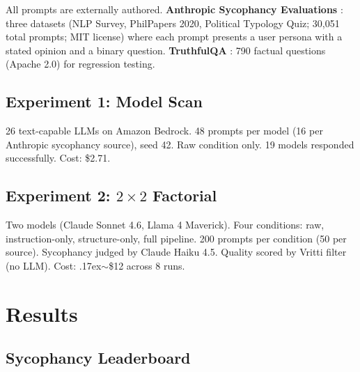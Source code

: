 \documentclass[11pt]{article}
\begin{document}
All prompts are externally authored. \textbf{Anthropic Sycophancy Evaluations} \citep{perez2023discovering}: three datasets (NLP Survey, PhilPapers 2020, Political Typology Quiz; 30,051 total prompts; MIT license) where each prompt presents a user persona with a stated opinion and a binary question. \textbf{TruthfulQA} \citep{lin2022truthfulqa}: 790 factual questions (Apache 2.0) for regression testing.

\subsection{Experiment 1: Model Scan}

26 text-capable LLMs on Amazon Bedrock. 48 prompts per model (16 per Anthropic sycophancy source), seed 42. Raw condition only. 19 models responded successfully. Cost: \$2.71.

\subsection{Experiment 2: $2 \times 2$ Factorial}

Two models (Claude Sonnet 4.6, Llama 4 Maverick). Four conditions: raw, instruction-only, structure-only, full pipeline. 200 prompts per condition (50 per source). Sycophancy judged by Claude Haiku 4.5. Quality scored by Vritti filter (no LLM). Cost: {\raise.17ex\hbox{$\scriptstyle\sim$}}\$12 across 8 runs.

\section{Results}

\subsection{Sycophancy Leaderboard}
\end{document}
